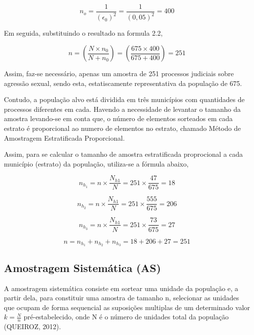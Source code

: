 \begin{equation}\label{nzero}
    n_{o}=\frac{1}{\left(\epsilon_{0}\right)^2}=\frac{1}{\left(0,05
    \right)^2}=400
\end{equation}

Em seguida, substituindo o resultado na formula 2.2,

\begin{equation}\label{nzero2}
    n=\left(\frac{N \times n_{0}}{N + n_{0}}\right)=
    \left(\frac{675 \times 400}{675 + 400}\right)=251
\end{equation}

Assim, faz-se necessário, apenas um amostra de 251 processos judiciais sobre
agressão sexual, sendo esta, estatiscamente representativa da população de 675.
\vskip0.3cm

Contudo, a população alvo está dividida em três municípios com quantidades
de processos diferentes em cada. Havendo a necessidade de levantar o tamanho da
amostra levando-se em conta que, o número de elementos sorteados em cada estrato
é proporcional ao numero de elementos no estrato, chamado Método de Amostragem
Estratificada Proporcional.
\vskip0.3cm

Assim, para se calcular o tamanho de amostra estratificada proprocional a cada
município (estrato) da população, utiliza-se a fórmula abaixo,


$$
n_{h_{1}}= n \times \frac{N_{h1}}{N}= 251 \times \frac{47}{675}= 18
$$


$$ 	n_{h_{2}}= n \times \frac{N_{h1}}{N}= 251 \times \frac{555}{675}= 206 $$

$$ 	n_{h_{3}}= n \times \frac{N_{h1}}{N}= 251 \times \frac{73}{675}= 27 $$

$$ n = n_{h_{1}} + n_{h_{2}} + n_{h_{3}} = 18+206+27 = 251
$$




\subsection{Amostragem Sistemática (AS)}


A amostragem sistemática consiste em sortear uma unidade da população e, a partir dela, para constituir
uma amostra de tamanho n, selecionar as unidades que ocupam de forma sequencial as suposições multiplas
de um determinado valor $k=\frac{N}{n}$ pré-estabelecido, onde N é o número de unidades total da população (QUEIROZ, 2012).\vskip0.3cm

